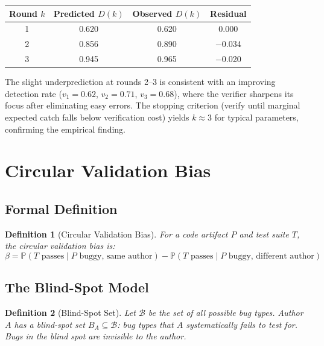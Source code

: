 \documentclass[11pt, a4paper, copyright]{googledeepmind}
\newtheorem{definition}{Definition}[section]
\newcommand{\Prob}{\mathbb{P}}
\newcommand{\calB}{\mathcal{B}}
\begin{document}
\begin{center}
\begin{tabular}{cccc}
\toprule
Round $k$ & Predicted $D(k)$ & Observed $D(k)$ & Residual \\
\midrule
1 & 0.620 & 0.620 & 0.000 \\
2 & 0.856 & 0.890 & $-$0.034 \\
3 & 0.945 & 0.965 & $-$0.020 \\
\bottomrule
\end{tabular}
\end{center}

The slight underprediction at rounds 2--3 is consistent with an improving detection rate ($v_1 = 0.62$, $v_2 = 0.71$, $v_3 = 0.68$), where the verifier sharpens its focus after eliminating easy errors.
The stopping criterion (verify until marginal expected catch falls below verification cost) yields $k \approx 3$ for typical parameters, confirming the empirical finding.

\section{Circular Validation Bias}
\label{sec:circular}

\subsection{Formal Definition}

\begin{definition}[Circular Validation Bias]
For a code artifact $P$ and test suite $T$, the \emph{circular validation bias} is:
\begin{equation}
\beta = \Prob(T \text{ passes} \mid P \text{ buggy, same author}) - \Prob(T \text{ passes} \mid P \text{ buggy, different author})
\end{equation}
\end{definition}

\subsection{The Blind-Spot Model}

\begin{definition}[Blind-Spot Set]
Let $\calB$ be the set of all possible bug types.
Author $A$ has a blind-spot set $B_A \subseteq \calB$: bug types that $A$ systematically fails to test for.
Bugs in the blind spot are invisible to the author.
\end{definition}
\end{document}
